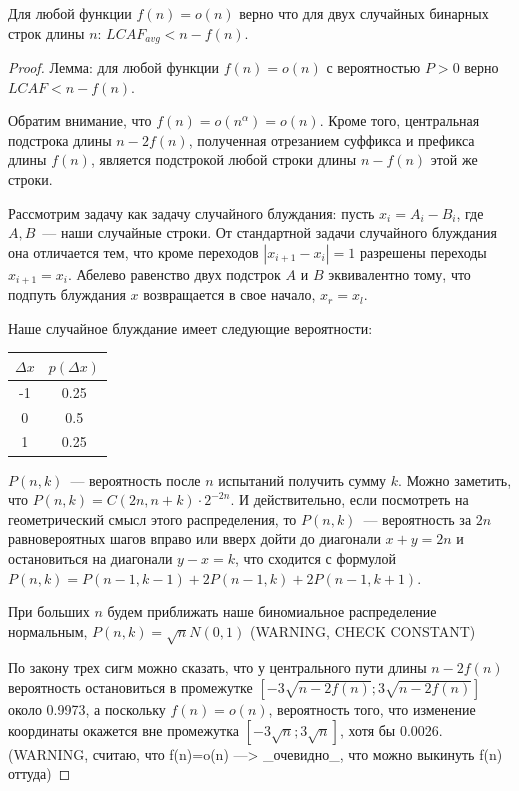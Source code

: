 \begin{theorem}
Для любой функции $f(n)=o(n)$ верно что для двух случайных бинарных строк длины $n$: $LCAF_{avg} < n - f(n)$.
\end{theorem}
\begin{proof}

Лемма: для любой функции $f(n)=o(n)$ с вероятностью $P>0$ верно $LCAF < n - f(n)$.

Обратим внимание, что $f(n) = o(n^\alpha) = o(n)$. Кроме того, центральная подстрока длины $n-2f(n)$, полученная отрезанием суффикса и префикса длины $f(n)$, является подстрокой любой строки длины $n-f(n)$ этой же строки.

Рассмотрим задачу как задачу случайного блуждания: пусть $x_i = A_i - B_i$, где $A, B$~--- наши случайные строки. От стандартной задачи случайного блуждания она отличается тем, что кроме переходов $|x_{i+1}-x_i|=1$ разрешены переходы $x_{i+1}=x_i$. Абелево равенство двух подстрок $A$ и $B$ эквивалентно тому, что подпуть блуждания $x$ возвращается в свое начало, $x_r=x_l$.

Наше случайное блуждание имеет следующие вероятности:

\begin{tabular}{|c|c|}
\hline
$\Delta x$ & $p(\Delta x)$ \\
\hline
-1 & 0.25 \\
\hline
0 & 0.5 \\
\hline
1 & 0.25 \\
\hline
\end{tabular}

$P(n, k)$~--- вероятность после $n$ испытаний получить сумму $k$. Можно заметить, что $P(n, k)=C(2n, n+k)\cdot 2^{-2n}$. И действительно, если посмотреть на геометрический смысл этого распределения, то $P(n,k)$~--- вероятность за $2n$ равновероятных шагов вправо или вверх дойти до диагонали $x+y=2n$ и остановиться на диагонали $y-x=k$, что сходится с формулой $P(n,k)=P(n-1,k-1)+2P(n-1,k)+2P(n-1,k+1)$.

При больших $n$ будем приближать наше биномиальное распределение нормальным, $P(n, k)=\sqrt n N(0,1)$ (WARNING, CHECK CONSTANT)

По закону трех сигм можно сказать, что у центрального пути длины $n-2f(n)$ вероятность остановиться в промежутке $[-3\sqrt{n-2f(n)}; 3\sqrt{n-2f(n)}]$ около 0.9973, а поскольку $f(n)=o(n)$, вероятность того, что изменение координаты окажется вне промежутка $[-3\sqrt{n}; 3\sqrt{n}]$, хотя бы 0.0026. (WARNING, считаю, что f(n)=o(n) ---> \_очевидно\_, что можно выкинуть f(n) оттуда)


\end{proof}
